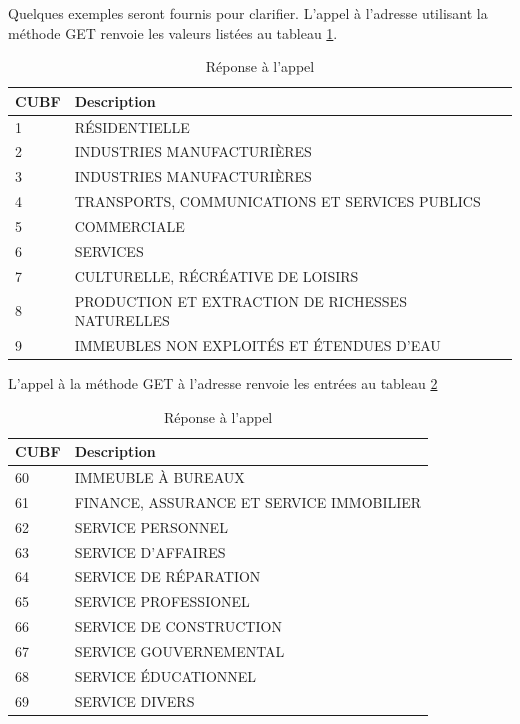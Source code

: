 Quelques exemples seront fournis pour clarifier. L'appel à l'adresse  \fg{} utilisant la méthode GET renvoie les valeurs listées au tableau \ref{tab:get-cubf-niv1}.\par
\begin{table}[h]
    \centering
    \caption{Réponse à l'appel \fg{}}
    \label{tab:get-cubf-niv1}
    \begin{tabular}{ll}
        \toprule
         CUBF & Description \\
         \midrule
         1 & RÉSIDENTIELLE \\
         2 & INDUSTRIES MANUFACTURIÈRES\\
         3 & INDUSTRIES MANUFACTURIÈRES \\
         4 & TRANSPORTS, COMMUNICATIONS ET SERVICES PUBLICS \\
         5 & COMMERCIALE \\
         6 & SERVICES \\
         7 & CULTURELLE, RÉCRÉATIVE DE LOISIRS \\
         8 & PRODUCTION ET EXTRACTION DE RICHESSES NATURELLES \\
         9 & IMMEUBLES NON EXPLOITÉS ET ÉTENDUES D'EAU\\ \bottomrule
    \end{tabular}
\end{table}
L'appel à la méthode GET à l'adresse \fg{} renvoie les entrées au tableau \ref{tab:get-cubf-niv2}\par
\begin{table}[h]
    \centering
    \caption{Réponse à l'appel \fg{}}
    \label{tab:get-cubf-niv2}
    \begin{tabular}{ll}
        \toprule
         CUBF & Description \\
         \midrule
         60 & IMMEUBLE À BUREAUX \\
         61 & FINANCE, ASSURANCE ET SERVICE IMMOBILIER\\
         62 & SERVICE PERSONNEL\\
         63 & SERVICE D'AFFAIRES \\
         64 & SERVICE DE RÉPARATION \\
         65 & SERVICE PROFESSIONEL \\
         66 & SERVICE DE CONSTRUCTION \\
         67 & SERVICE GOUVERNEMENTAL\\
         68 & SERVICE ÉDUCATIONNEL\\ 
         69 & SERVICE DIVERS \\\bottomrule
    \end{tabular}
    
\end{table}
